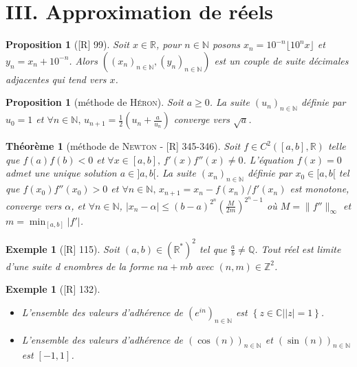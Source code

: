 \documentclass[10pt, a4paper, parskip=full, twoside, twocolumn]{report}
\newtheorem{theorem}[definition]{Théorème}
\newtheorem{proposition}[definition]{Proposition}
\newtheorem{example}[definition]{Exemple}
\newcommand{\IN}{\mathbb{N}}
\newcommand{\IZ}{\mathbb{Z}}
\newcommand{\IQ}{\mathbb{Q}}
\newcommand{\IC}{\mathbb{C}}
\newcommand{\IR}{\mathbb{R}}
\begin{document}
\section*{III. Approximation de réels}
\begin{proposition}[\textnormal{[R] 99}]
	Soit $x\in\IR$, pour $n\in\IN$ posons $x_n = 10^{-n}\lfloor 10^nx\rfloor$ et $y_n = x_n + 10^{-n}$.
	Alors $\left(\left(x_n\right)_{n\in\IN}, \left(y_n\right)_{n\in\IN}\right)$ est un couple de suite décimales adjacentes qui tend vers $x$.
\end{proposition}

\begin{proposition}[méthode de \textsc{Héron}]
	Soit $a\geq 0$. La suite $\left(u_n\right)_{n\in\IN}$ définie par $u_0 = 1$ et $\forall n\in \IN,\, u_{n+1} = \frac{1}{2}(u_n + \frac{a}{u_n})$ converge vers $\sqrt{a}$.
\end{proposition}

\begin{theorem}[méthode de \textsc{Newton} - \textnormal{[R] 345-346}]
	Soit $f\in C^2([a,b], \IR)$ telle que $f(a)f(b) < 0$ et $\forall x \in [a,b],\, f'(x)f''(x) \neq 0$. L'équation $f(x) = 0$ admet une unique solution $a\in ]a,b[$.
	La suite $\left(x_n\right)_{n\in\IN}$ définie par $x_0\in [a,b[$ tel que $f(x_0)f''(x_0) > 0$ et $\forall n\in \IN,\, x_{n+1} = x_n - f(x_n)/f'(x_n)$ est monotone, converge vers $\alpha$, et $\forall n\in \IN$, 
	$\vert x_n - \alpha\vert \leq (b-a)^{2^n}\left(\frac{M}{2m}\right)^{2^n-1}$ où $M = \|f''\|_{\infty}$ et $m = \min_{[a,b]} \vert f'\vert$.
\end{theorem}

\begin{example}[\textnormal{[R] 115}]
	Soit $(a,b)\in\left(\IR^*\right)^2$ tel que $\frac{a}{b}\neq \IQ$. Tout réel est limite d'une suite d enombres de la forme $na + mb$ avec $(n,m)\in \IZ^2$.
\end{example}

\begin{example}[\textnormal{[R] 132}]
	\begin{itemize}
		\item L'ensemble des valeurs d'adhérence de $\left(e^{in}\right)_{n\in\IN}$ est $\left\{z\in\IC\mid \vert z\vert =1\right\}$.
		\item L'ensemble des valeurs d'adhérence de $\left(\cos(n)\right)_{n\in\IN}$ et $\left(\sin(n)\right)_{n\in\IN}$ est $[-1,1]$.
	\end{itemize}
\end{example}
\end{document}
